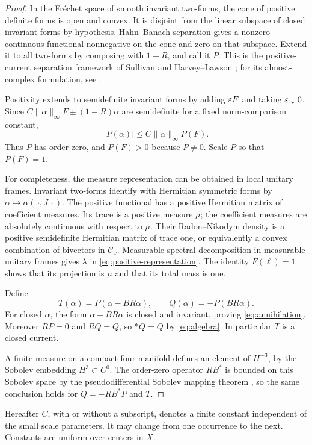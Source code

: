 \begin{proof}
In the Fr\'echet space of smooth invariant two-forms, the cone of
positive definite forms is open and convex. It is disjoint from
the linear subspace of closed invariant forms by hypothesis.
Hahn--Banach separation gives a nonzero continuous functional
nonnegative on the cone and zero on that subspace. Extend it to
all two-forms by composing with \(1-R\), and call it \(P\).
This is the positive-current separation framework of
Sullivan and Harvey--Lawson \cite{Sullivan1976,HarveyLawson1983};
for its almost-complex formulation, see
\cite[Section~3]{LiZhang2009}.

Positivity extends to semidefinite invariant forms by adding
\(\varepsilon F\) and taking \(\varepsilon\downarrow0\).
Since \(C\|\alpha\|_\infty F\pm(1-R)\alpha\) are semidefinite
for a fixed norm-comparison constant,
\[
|P(\alpha)|\le C\|\alpha\|_\infty P(F).
\]
Thus \(P\) has order zero, and \(P(F)>0\) because \(P\ne0\).
Scale \(P\) so that \(P(F)=1\).

For completeness, the measure representation can be obtained
in local unitary frames. Invariant two-forms identify with
Hermitian symmetric forms by
\(\alpha\mapsto\alpha(\,\cdot,J\,\cdot)\).
The positive functional has a positive Hermitian matrix of
coefficient measures. Its trace is a positive measure \(\mu\);
the coefficient measures are absolutely continuous with
respect to \(\mu\). Their Radon--Nikodym density is a positive
semidefinite Hermitian matrix of trace one, or equivalently
a convex combination of bivectors in \(\mathscr C_x\).
Measurable spectral decomposition in measurable unitary frames
gives \(\lambda\) in \eqref{eq:positive-representation}.
The identity \(F(\ell)=1\) shows that its projection is \(\mu\)
and that its total mass is one.

Define
\[
T(\alpha)=P(\alpha-BR\alpha),\qquad
Q(\alpha)=-P(BR\alpha).
\]
For closed \(\alpha\), the form \(\alpha-BR\alpha\) is closed
and invariant, proving \eqref{eq:annihilation}. Moreover \(RP=0\)
and \(RQ=Q\), so \(*Q=Q\) by \eqref{eq:algebra}.
In particular \(T\) is a closed current.

A finite measure on a compact four-manifold defines an element
of \(H^{-3}\), by the Sobolev embedding \(H^3\subset C^0\).
The order-zero operator \(RB^*\) is bounded on this Sobolev
space by the pseudodifferential Sobolev mapping theorem
\cite[Proposition~0.5.E]{Taylor1991}, so the same conclusion
holds for \(Q=-RB^*P\) and \(T\).
\end{proof}

Hereafter \(C\), with or without a subscript, denotes a finite
constant independent of the small scale parameters. It may
change from one occurrence to the next. Constants are uniform
over centers in \(X\).
